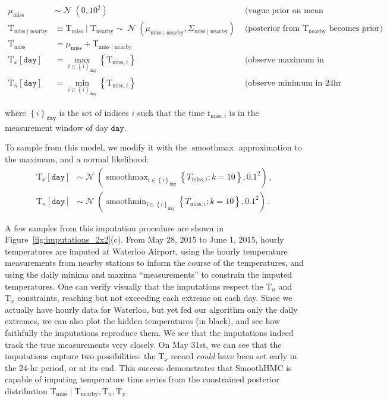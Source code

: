 \documentclass[letter]{article}
\newcommand{\genericdel}[3]{%
      \left#1#3\right#2
    }
\newcommand{\del}[1]{\genericdel(){#1}}
\newcommand{\sbr}[1]{\genericdel[]{#1}}
\newcommand{\cbr}[1]{\genericdel\{\}{#1}}
\DeclareMathOperator{\normal}{\mathcal{N}}
\newcommand{\T}{\mathrm{T}}
\newcommand{\Tn}{\T_{n}}
\newcommand{\Tx}{\T_{x}}
\newcommand{\miss}{\mathrm{miss}}
\newcommand{\obs}{\mathrm{nearby}}
\DeclareMathOperator*{\softmax}{smoothmax}
\DeclareMathOperator*{\softmin}{smoothmin}
\newcommand{\iday}{\mathtt{day}}
\newcommand{\dayset}[1]{\cbr{i}_{#1}}
\newcommand{\eqlabel}[1]{\label{#1}}
\begin{document}
\begin{equation}
\begin{aligned}
    \mu_{\miss} &\sim \normal\del{0,10^2} & \text{ (vague prior on mean temperature)} \\
    \T_{\miss \mid \obs} &\equiv \T_{\miss} \mid \T_\obs \sim \normal\del{\mu_{\miss \mid \obs}, \Sigma_{\miss \mid \obs}} & \text{ (posterior from $\T_\obs$ becomes prior)} \\
    \T_\miss &= \mu_\miss + \T_{\miss \mid \obs} \\
    \Tx\sbr{\iday} &= \max_{i \in \dayset{\iday}}\cbr{ \T_{\miss,i}} & \text{ (observe maximum in 24hr window)}\\
    \Tn\sbr{\iday} &= \min_{i \in \dayset{\iday}}\cbr{ \T_{\miss,i}} & \text{ (observe minimum in 24hr window)}
\end{aligned}
\eqlabel{eq:idealmodel}
\end{equation}

where \(\dayset{\iday}\) is the set of indices \(i\) such that the time \(t_{\miss,i}\) is in the measurement window of day \(\iday\).
    


        To sample from this model, we modify it with the \(\softmax\) approximation to the maximum, and a normal likelihood:
\begin{equation}
\begin{split}
    \Tx\sbr{\iday} &\sim \normal\del{\softmax_{i \in \dayset{\iday}} \cbr{ T_{\miss,i}; k=10}, 0.1^2}\,, \\
    \Tn\sbr{\iday} &\sim \normal\del{\softmin_{i \in \dayset{\iday}} \cbr{ T_{\miss,i}; k=10}, 0.1^2}\,.
\end{split}
\eqlabel{eq:smoothed_model}
\end{equation}
    


        A few samples from this imputation procedure are shown in Figure~\ref{fig:imputations_2x2}(c).
From May 28, 2015 to June 1, 2015, hourly temperatures are imputed at Waterloo Airport, using the hourly temperature measurements from nearby stations to inform the course of the temperatures, and using the daily minima and maxima ``measurements'' to constrain the imputed temperatures.
One can verify visually that the imputations respect the \(\Tn\) and \(\Tx\) constraints, reaching but not exceeding each extreme on each day.
Since we actually have hourly data for Waterloo, but yet fed our algorithm only the daily extremes, we can also plot the hidden temperatures (in black), and see how faithfully the imputations reproduce them.
We see that the imputations indeed track the true measurements very closely.
On May 31st, we can see that the imputations capture two possibilities: the \(\Tx\) record \emph{could} have been set early in the 24-hr period, or at its end.
This success demonstrates that SmoothHMC is capable of imputing temperature time series from the constrained posterior distribution \(\T_\miss \mid \T_\obs, \Tn, \Tx\).
    
\end{document}
